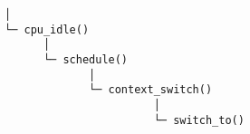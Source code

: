 \documentclass[varwidth,crop]{standalone}
\begin{document}
\begin{verbatim}
│
└─ cpu_idle()
      │
      └─ schedule()
             │
             └─ context_switch()
                       │
                       └─ switch_to()
\end{verbatim}
\end{document}
